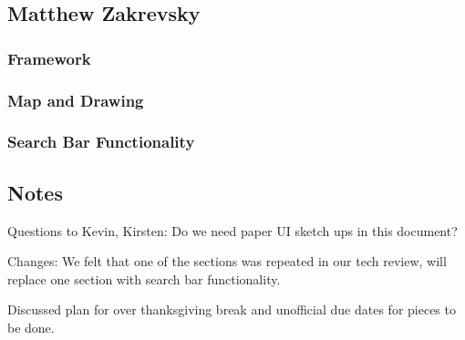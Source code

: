 \documentclass[letterpaper,10pt,titlepage, onecolumn, compsoc]{IEEEtran}
\begin{document}
\subsection{Matthew Zakrevsky}
\subsubsection{Framework}
\subsubsection{Map and Drawing}
\subsubsection{Search Bar Functionality}
\newpage

\subsection{Notes}
Questions to Kevin, Kirsten:
Do we need paper UI sketch ups in this document?

Changes:
We felt that one of the sections was repeated in our tech review, will replace one section with search bar functionality. 

Discussed plan for over thanksgiving break and unofficial due dates for pieces to be done. 







\newpage
%
%
\end{document}
